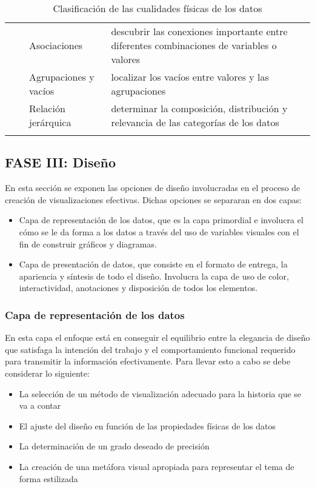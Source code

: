 \begin{longtable}[c]{|p{3cm}|p{2cm}|p{3cm}|p{7cm}|}
  \cline{3-4}
  &   & Asociaciones & descubrir las conexiones importante entre diferentes combinaciones de variables o valores \\
  \cline{3-4}
  &   & Agrupaciones y vacíos & localizar los vacíos entre valores y las agrupaciones \\
  \cline{3-4}
  &   & Relación jerárquica & determinar la composición, distribución y relevancia de las categorías de los datos \\
  \hline
  \caption[Clasificación de las cualidades físicas de los datos]{Clasificación de las cualidades físicas de los datos}
  \label{table:tb1}
\end{longtable}

\subsection{FASE III: Diseño}
En esta sección se exponen las opciones de diseño involucradas en el proceso de creación de visualizaciones efectivas. Dichas opciones se separaran en dos capas:

\begin{itemize}
  \item Capa de representación de los datos, que es la capa primordial e involucra el cómo se le da forma a los datos a través del uso de variables visuales con el fin de construir gráficos y diagramas. 
  \item Capa de presentación de datos, que consiste en el formato de entrega, la apariencia y síntesis de todo el diseño. Involucra la capa de uso de color, interactividad, anotaciones y disposición de todos los elementos.
\end{itemize}

\subsubsection{Capa de representación de los datos}

En esta capa el enfoque está en conseguir el equilibrio entre la elegancia de diseño que satisfaga la intención del trabajo y el comportamiento funcional requerido para transmitir la información efectivamente. Para llevar esto a cabo se debe considerar lo siguiente:

\begin{itemize}
  \item La selección de un método de visualización adecuado para la historia que se va a contar
  \item El ajuste del diseño en función de las propiedades físicas de los datos
  \item La determinación de un grado deseado de precisión
  \item La creación de una metáfora visual apropiada para representar el tema de forma estilizada
\end{itemize}

